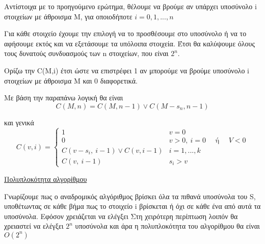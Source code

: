 \documentclass[12pt]{article}
\begin{document}
\begin{enumerate}
            Αντίστοιχα με το προηγούμενο ερώτημα, θέλουμε να βρούμε αν υπάρχει υποσύνολο i
            στοιχείων με άθροισμα Μ, για οποιοδήποτε $i = 0,1,...,n$

            Για κάθε στοιχείο έχουμε την επιλογή να το προσθέσουμε στο υποσύνολο ή να το αφήσουμε εκτός 
            και να εξετάσουμε τα υπόλοιπα στοιχεία. Έτσι θα καλύψουμε όλους τους δυνατούς συνδυασμούς των n στοιχείων, 
            που είναι $2^n$. 

            Ορίζω την C(M,i) έτσι ώστε να επιστρέφει 1 αν μπορούμε να βρούμε υποσύνολο i στοιχείων με άθροισμα Μ και 0 διαφορετικά.

            Με βάση την παραπάνω λογική θα είναι \[C(M,n) = C(M, n-1) \lor C(M-s_n, n-1)\]
            
            και γενικά \[ C(v, i) =\begin{cases} 
                1 & v =0 \\
                0 & v>0,\:i=0 \quad\text{ ή }\quad V< 0\\
                C(v-s_i, \: i-1) \lor C(v, i-1) &i=1,...,k\\
                C(v, \: i-1) &s_i > v
                    \end{cases}
            \]

        \underline{Πολυπλοκότητα αλγορίθμου}
        
        Γνωρίζουμε πως ο αναδρομικός αλγόριθμος βρίσκει όλα τα πιθανά υποσύνολα του S, υποθέτωντας σε κάθε 
        βήμα πως το στοιχείο i βρίσκεται ή όχι σε κάθε ένα από αυτά τα υποσύνολα. Εφόσον χρειάζεται να ελέγξει 
        Στη χειρότερη περίπτωση λοιπόν θα χρειαστεί να ελέγξει $2^n$ υποσύνολα και άρα η πολυπλοκότητα
        του αλγορίθμου θα είναι $Ο(2^n)$
    \end{enumerate}
\end{document}
